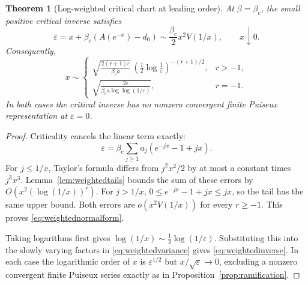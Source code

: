 \documentclass[11pt,a4paper]{article}
\numberwithin{equation}{section}
\newtheorem{theorem}{Theorem}[section]
\theoremstyle{definition}
\theoremstyle{remark}
\newcommand{\bc}{\beta_{\mathrm c}}
\newcommand{\eps}{\varepsilon}
\begin{document}
\begin{theorem}[Log-weighted critical chart at leading order]
\label{thm:weightedchart}
At $\beta=\bc$, the small positive critical inverse satisfies
\begin{equation}\label{eq:weightednormalform}
 \eps=x+\bc(A(e^{-x})-d_0)
       \sim\frac{\bc}{2}x^2V(1/x),\qquad x\downarrow0.
\end{equation}
Consequently,
\begin{equation}\label{eq:weightedinverse}
 x\sim
 \begin{cases}
 \displaystyle
 \sqrt{\frac{2(r+1)\eps}{\bc a}}\,
       \left(\frac12\log\frac1\eps\right)^{-(r+1)/2},&r>-1,\\[6pt]
 \displaystyle
 \sqrt{\frac{2\eps}{\bc a\log\log(1/\eps)}},&r=-1.
 \end{cases}
\end{equation}
In both cases the critical inverse has no nonzero convergent finite
Puiseux representation at $\eps=0$.
\end{theorem}
\begin{proof}
Criticality cancels the linear term exactly:
\[
 \eps=\bc\sum_{j\ge1}a_j(e^{-jx}-1+jx).
\]
For $j\le1/x$, Taylor's formula differs from $j^2x^2/2$ by at most
a constant times $j^3x^3$. Lemma~\ref{lem:weightedtails} bounds the
sum of these errors by $O(x^2(\log(1/x))^r)$. For $j>1/x$,
$0\le e^{-jx}-1+jx\le jx$, so the tail has the same upper bound.
Both errors are $o(x^2V(1/x))$ for every $r\ge-1$. This proves
\eqref{eq:weightednormalform}.

Taking logarithms first gives
$\log(1/x)\sim\tfrac12\log(1/\eps)$. Substituting this into the
slowly varying factors in \eqref{eq:weightedvariance} gives
\eqref{eq:weightedinverse}. In each case the logarithmic order of
$x$ is $\eps^{1/2}$ but $x/\sqrt\eps\to0$, excluding a nonzero
convergent finite Puiseux series exactly as in
Proposition~\ref{prop:ramification}.
\end{proof}
\end{document}
